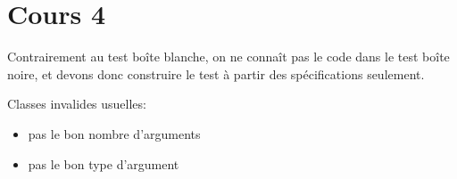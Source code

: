 \section{Cours 4}
Contrairement au test boîte blanche, on ne connaît pas le code dans le test boîte noire, et devons donc construire le
test à partir des spécifications seulement.

Classes invalides usuelles:
\begin{itemize}
	\item pas le bon nombre d'arguments
	\item pas le bon type d'argument
\end{itemize}
